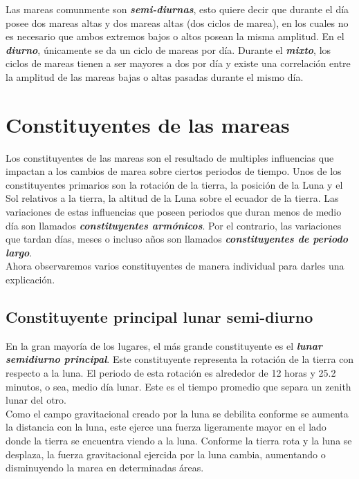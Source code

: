\documentclass{article}
\begin{document}
Las mareas comunmente son \textit{\textbf{semi-diurnas}}, esto quiere decir que durante el día posee dos mareas altas y dos mareas altas (dos ciclos de marea), en los cuales no es necesario que ambos extremos bajos o altos posean la misma amplitud. En el \textit{\textbf{diurno}}, únicamente se da un ciclo de mareas por día. Durante el \textit{\textbf{mixto}}, los ciclos de mareas tienen a ser mayores a dos por día y existe una correlación entre la amplitud de las mareas bajas o altas pasadas durante el mismo día.
\pagebreak
\section{\Large Constituyentes de las mareas}
Los constituyentes de las mareas son el resultado de multiples influencias que impactan a los cambios de marea sobre ciertos periodos de tiempo. Unos de los constituyentes primarios son la rotación de la tierra, la posición de la Luna y el Sol relativos a la tierra, la altitud de la Luna sobre el ecuador de la tierra. Las variaciones de estas influencias que poseen periodos que duran menos de medio día son llamados \textit{\textbf{constituyentes armónicos}}. Por el contrario, las variaciones que tardan días, meses o incluso años son llamados \textit{\textbf{constituyentes de periodo largo}}.\\
Ahora observaremos varios constituyentes de manera individual para darles una explicación.

\subsection{\Large Constituyente principal lunar semi-diurno}
En la gran mayoría de los lugares, el más grande constituyente es el \textit{\textbf{lunar semidiurno principal}}. Este constituyente representa la rotación de la tierra con respecto a la luna. El periodo de esta rotación es alrededor de 12 horas y 25.2 minutos, o sea, medio día lunar. Este es el tiempo promedio que separa un zenith lunar del otro.\\

Como el campo gravitacional creado por la luna se debilita conforme se aumenta la distancia con la luna, este ejerce una fuerza ligeramente mayor en el lado donde la tierra se encuentra viendo a la luna. Conforme la tierra rota y la luna se desplaza, la fuerza gravitacional ejercida por la luna cambia, aumentando o disminuyendo la marea en determinadas áreas.\\
\end{document}

